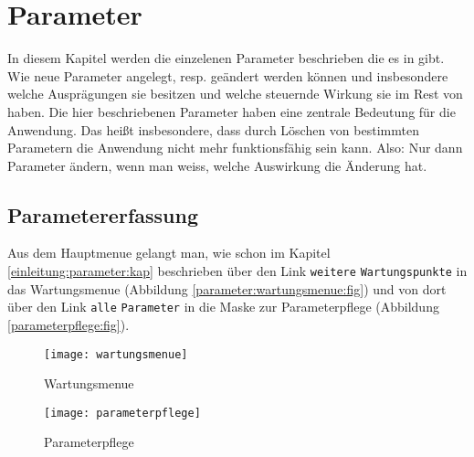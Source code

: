 






\chapter{Parameter\label{parameter:kap}}
In diesem Kapitel werden die einzelenen Parameter beschrieben die
es in \tinyHeb\/ gibt. Wie neue Parameter angelegt, resp. geändert werden
können und insbesondere welche Ausprägungen sie besitzen und welche
steuernde Wirkung sie im Rest von \tinyHeb\/ haben. Die hier beschriebenen
Parameter haben eine zentrale Bedeutung für die Anwendung. Das heißt
insbesondere, dass durch Löschen von bestimmten Parametern die Anwendung
nicht mehr funktionsfähig sein kann. Also: Nur dann Parameter ändern,
wenn man weiss, welche Auswirkung die Änderung hat.
\marginline{\Huge\bfseries!}%

\section{Parametererfassung}
Aus dem Hauptmenue gelangt man, wie schon im Kapitel 
\vref{einleitung:parameter:kap} beschrieben über den Link 
\verb|weitere| \verb|Wartungspunkte| in das \tinyHeb\/ 
Wartungsmenue (Abbildung \vref{parameter:wartungsmenue:fig}) und von dort über den
Link \verb|alle| \verb|Parameter| in die Maske zur Parameterpflege 
(Abbildung \vref{parameterpflege:fig}).
%
\begin{figure}[h]
\centering
\texttt{[image: wartungsmenue]}
\caption{\tinyHeb\/ Wartungsmenue \label{parameter:wartungsmenue:fig}}
\end{figure}
%
\begin{figure}[ht]
\centering
\texttt{[image: parameterpflege]}
\caption{Parameterpflege\label{parameterpflege:fig}}
\end{figure}
%

